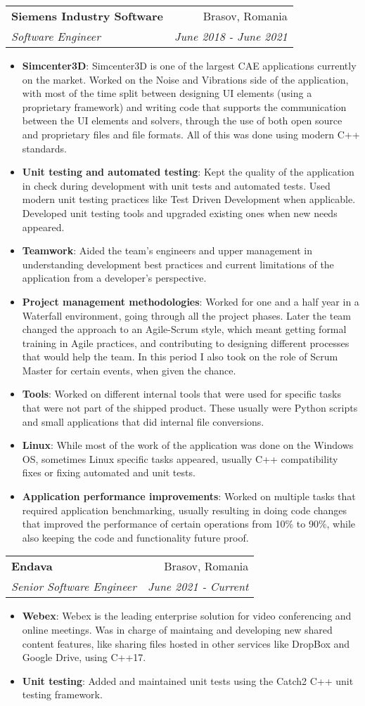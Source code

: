 \documentclass[letterpaper,11pt]{article}
\makeatletter
\newcommand{\resumeItem}[2]{
  \item\small{
    \textbf{#1}{: #2 \vspace{-2pt}}
  }
}
\newcommand{\resumeSubheading}[4]{
  \vspace{-1pt}\item
    \begin{tabular*}{0.97\textwidth}[t]{l@{\extracolsep{\fill}}r}
      \textbf{#1} & #2 \\
      \textit{\small#3} & \textit{\small #4} \\
    \end{tabular*}\vspace{-5pt}
}
\newcommand{\resumeItemListStart}{\begin{itemize}}
\newcommand{\resumeItemListEnd}{\end{itemize}\vspace{-5pt}}
\makeatother
\begin{document}
    \resumeSubheading
      {Siemens Industry Software}{Brasov, Romania}
      {Software Engineer}{June 2018 - June 2021}
      \resumeItemListStart
        \resumeItem{Simcenter3D}
          {Simcenter3D is one of the largest CAE applications currently on the market. Worked on the Noise and Vibrations side of the application, with most of the time split between designing UI elements (using a proprietary framework) and writing code that supports the communication between the UI elements and solvers, through the use of both open source and proprietary files and file formats. All of this was done using modern C++ standards.}
        \resumeItem{Unit testing and automated testing}
          {Kept the quality of the application in check during development with unit tests and automated tests. Used modern unit testing practices like Test Driven Development when applicable. Developed unit testing tools and upgraded existing ones when new needs appeared.}
        \resumeItem{Teamwork}
          {Aided the team's engineers and upper management in understanding development best practices and current limitations of the application from a developer's perspective.}
        \resumeItem{Project management methodologies}
          {Worked for one and a half year in a Waterfall environment, going through all the project phases. Later the team changed the approach to an Agile-Scrum style, which meant getting formal training in Agile practices, and contributing to designing different processes that would help the team. In this period I also took on the role of Scrum Master for certain events, when given the chance.}
        \resumeItem{Tools}
          {Worked on different internal tools that were used for specific tasks that were not part of the shipped product. These usually were Python scripts and small applications that did internal file conversions.}
        \resumeItem{Linux}
          {While most of the work of the application was done on the Windows OS, sometimes Linux specific tasks appeared, usually C++ compatibility fixes or fixing automated and unit tests.}
        \resumeItem{Application performance improvements}
          {Worked on multiple tasks that required application benchmarking, usually resulting in doing code changes that improved the performance of certain operations from 10\% to 90\%, while also keeping the code and functionality future proof.}
      \resumeItemListEnd
    \resumeSubheading
      {Endava}{Brasov, Romania}
      {Senior Software Engineer}{June 2021 - Current}
      \resumeItemListStart
        \resumeItem{Webex}
          {Webex is the leading enterprise solution for video conferencing and online meetings. Was in charge of maintaing and developing new shared content features, like sharing files hosted in other services like DropBox and Google Drive, using C++17.}
        \resumeItem{Unit testing}
          {Added and maintained unit tests using the Catch2 C++ unit testing framework.}
      \resumeItemListEnd
      
\end{document}
